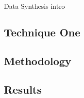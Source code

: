 Data Synthesis intro

\subsection{Technique One}
\label{subsec:2.3_datsynth_tech1}

\subsection{Methodology}

\subsection{Results}


